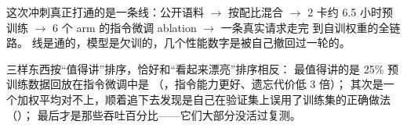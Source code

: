 这次冲刺真正打通的是一条线：公开语料 $\to$ 按配比混合 $\to$ 2 卡约 6.5 小时预训练 $\to$
6 个 arm 的指令微调 ablation $\to$ 一条真实请求走完  到自训权重的全链路。
线是通的，模型是欠训的，几个性能数字是被自己撤回过一轮的。

三样东西按“值得讲”排序，恰好和“看起来漂亮”排序相反：
最值得讲的是 25\% 预训练数据回放在指令微调中是
（，指令能力更好、遗忘代价低 3 倍）；
其次是一个加权平均对不上，顺着追下去发现是自己在验证集上误用了训练集的正确做法（）；
最后才是那些吞吐百分比——它们大部分没活过复测。
